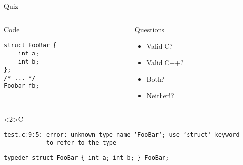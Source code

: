 \documentclass[presentation,aspectratio=169]{beamer}
\begin{document}
\begin{frame}[fragile,label={sec:org1921130}]{Quiz}
\begin{columns}
\begin{column}{0.48\columnwidth}
\begin{block}{Code}
\begin{verbatim}
struct FooBar {
    int a;
    int b;
};
/* ... */
Foobar fb;
\end{verbatim}
\end{block}
\end{column}

\begin{column}{0.48\columnwidth}
\begin{block}{Questions}
\begin{itemize}
\item Valid C?
\item Valid C++?
\item Both?
\item Neither!?
\end{itemize}

\vspace{0.5cm}
\end{block}
\end{column}
\end{columns}
\begin{block}<2>{C}
\begin{verbatim}
test.c:9:5: error: unknown type name ‘FooBar’; use ‘struct’ keyword
            to refer to the type
\end{verbatim}

\begin{verbatim}
typedef struct FooBar { int a; int b; } FooBar;
\end{verbatim}
\end{block}
\end{frame}


\end{document}
